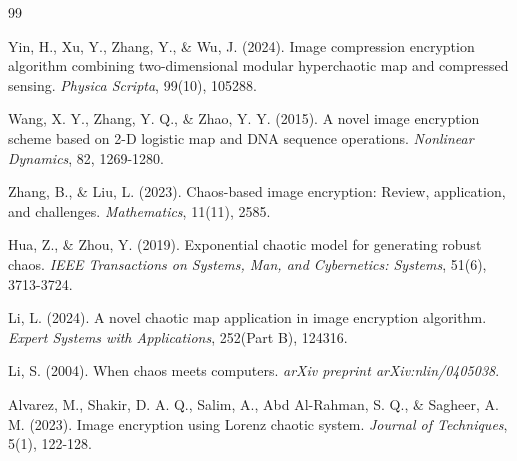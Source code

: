 
\renewcommand{\bibname}{فهرست منابع}
\addcontentsline{toc}{chapter}{\bibname}
\begin{thebibliography}{99}

\begin{LTRbibitems}
 Yin, H., Xu, Y., Zhang, Y., \& Wu, J. (2024). Image compression encryption algorithm combining two-dimensional modular hyperchaotic map and compressed sensing. \textit{Physica Scripta}, 99(10), 105288.
\end{LTRbibitems}

\begin{LTRbibitems}
 Wang, X. Y., Zhang, Y. Q., \& Zhao, Y. Y. (2015). A novel image encryption scheme based on 2-D logistic map and DNA sequence operations. \textit{Nonlinear Dynamics}, 82, 1269-1280.
\end{LTRbibitems}

\begin{LTRbibitems}
 Zhang, B., \& Liu, L. (2023). Chaos-based image encryption: Review, application, and challenges. \textit{Mathematics}, 11(11), 2585.
\end{LTRbibitems}

\begin{LTRbibitems}
 Hua, Z., \& Zhou, Y. (2019). Exponential chaotic model for generating robust chaos. \textit{IEEE Transactions on Systems, Man, and Cybernetics: Systems}, 51(6), 3713-3724.
\end{LTRbibitems}

\begin{LTRbibitems}
 Li, L. (2024). A novel chaotic map application in image encryption algorithm. \textit{Expert Systems with Applications}, 252(Part B), 124316.
\end{LTRbibitems}

\begin{LTRbibitems}
 Li, S. (2004). When chaos meets computers. \textit{arXiv preprint arXiv:nlin/0405038}.
\end{LTRbibitems}

\begin{LTRbibitems}
 Alvarez, M., Shakir, D. A. Q., Salim, A., Abd Al-Rahman, S. Q., \& Sagheer, A. M. (2023). Image encryption using Lorenz chaotic system. \textit{Journal of Techniques}, 5(1), 122-128.
\end{LTRbibitems}


\end{thebibliography}
